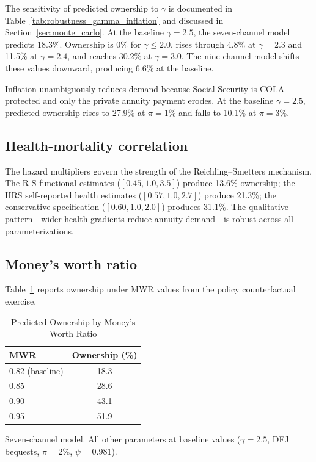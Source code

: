 \documentclass[12pt]{article}
\begin{document}
The sensitivity of predicted ownership to $\gamma$ is documented in Table~\ref{tab:robustness_gamma_inflation} and discussed in Section~\ref{sec:monte_carlo}. At the baseline $\gamma = 2.5$, the seven-channel model predicts 18.3\%. Ownership is 0\% for $\gamma \leq 2.0$, rises through 4.8\% at $\gamma = 2.3$ and 11.5\% at $\gamma = 2.4$, and reaches 30.2\% at $\gamma = 3.0$. The nine-channel model shifts these values downward, producing 6.6\% at the baseline.

Inflation unambiguously reduces demand because Social Security is COLA-protected and only the private annuity payment erodes. At the baseline $\gamma = 2.5$, predicted ownership rises to 27.9\% at $\pi = 1\%$ and falls to 10.1\% at $\pi = 3\%$.

\subsection{Health-mortality correlation}

The hazard multipliers govern the strength of the Reichling--Smetters mechanism. The R-S functional estimates ($[0.45, 1.0, 3.5]$) produce 13.6\% ownership; the HRS self-reported health estimates ($[0.57, 1.0, 2.7]$) produce 21.3\%; the conservative specification ($[0.60, 1.0, 2.0]$) produces 31.1\%. The qualitative pattern---wider health gradients reduce annuity demand---is robust across all parameterizations.

\subsection{Money's worth ratio}

Table~\ref{tab:mwr_sensitivity} reports ownership under MWR values from the policy counterfactual exercise.

\begin{table}[htbp]
\centering
\caption{Predicted Ownership by Money's Worth Ratio}
\label{tab:mwr_sensitivity}
\begin{threeparttable}
\begin{tabular}{lc}
\toprule
MWR & Ownership (\%) \\
\midrule
0.82 (baseline) & 18.3 \\
0.85 & 28.6 \\
0.90 & 43.1 \\
0.95 & 51.9 \\
\bottomrule
\end{tabular}
\begin{tablenotes}
\small
\item Seven-channel model. All other parameters at baseline values ($\gamma = 2.5$, DFJ bequests, $\pi = 2\%$, $\psi = 0.981$).
\end{tablenotes}
\end{threeparttable}
\end{table}
\end{document}
